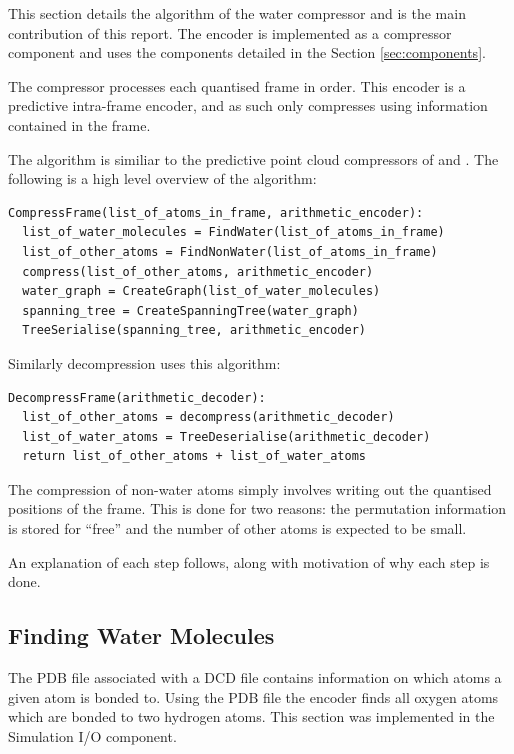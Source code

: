 \documentclass[a4paper]{report}
\begin{document}
This section details the algorithm of the water compressor and is the main
contribution of this report. The encoder is implemented as a compressor
component and uses the components detailed in the Section
\ref{sec:components}.

The compressor processes each quantised frame in order. This encoder is a
predictive intra-frame encoder, and as such only compresses using information
contained in the frame.

The algorithm is similiar to the predictive point cloud compressors of
\citet{gumholdcomp} and \citet{merrycomp}. The following is a high level
overview of the algorithm:

\begin{verbatim}
CompressFrame(list_of_atoms_in_frame, arithmetic_encoder):
  list_of_water_molecules = FindWater(list_of_atoms_in_frame)
  list_of_other_atoms = FindNonWater(list_of_atoms_in_frame)
  compress(list_of_other_atoms, arithmetic_encoder)
  water_graph = CreateGraph(list_of_water_molecules)
  spanning_tree = CreateSpanningTree(water_graph)
  TreeSerialise(spanning_tree, arithmetic_encoder)
\end{verbatim}

\noindent Similarly decompression uses this algorithm:

\begin{verbatim}
DecompressFrame(arithmetic_decoder):
  list_of_other_atoms = decompress(arithmetic_decoder)
  list_of_water_atoms = TreeDeserialise(arithmetic_decoder)
  return list_of_other_atoms + list_of_water_atoms
\end{verbatim}

The compression of non-water atoms simply involves writing out the quantised
positions of the frame. This is done for two reasons: the permutation
information is stored for ``free'' and the number of other atoms is expected
to be small.

An explanation of each step follows, along with motivation of why each step is
done.


\subsection{Finding Water Molecules}

The PDB file associated with a DCD file contains information on which atoms a
given atom is bonded to. Using the PDB file the encoder finds all oxygen atoms
which are bonded to two hydrogen atoms. This section was implemented in the
Simulation I/O component.
\end{document}
